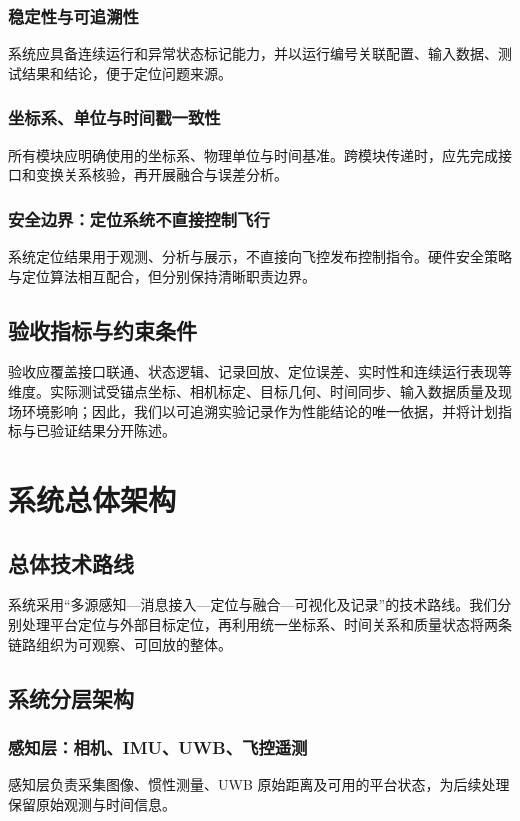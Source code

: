 \documentclass[UTF8,a4paper,12pt]{ctexart}
\begin{document}
\subsubsection{稳定性与可追溯性}
系统应具备连续运行和异常状态标记能力，并以运行编号关联配置、输入数据、测试结果和结论，便于定位问题来源。

\subsubsection{坐标系、单位与时间戳一致性}
所有模块应明确使用的坐标系、物理单位与时间基准。跨模块传递时，应先完成接口和变换关系核验，再开展融合与误差分析。

\subsubsection{安全边界：定位系统不直接控制飞行}
系统定位结果用于观测、分析与展示，不直接向飞控发布控制指令。硬件安全策略与定位算法相互配合，但分别保持清晰职责边界。

\subsection{验收指标与约束条件}
验收应覆盖接口联通、状态逻辑、记录回放、定位误差、实时性和连续运行表现等维度。实际测试受锚点坐标、相机标定、目标几何、时间同步、输入数据质量及现场环境影响；因此，我们以可追溯实验记录作为性能结论的唯一依据，并将计划指标与已验证结果分开陈述。

\section{系统总体架构}\label{sec:architecture}
\subsection{总体技术路线}
系统采用“多源感知—消息接入—定位与融合—可视化及记录”的技术路线。我们分别处理平台定位与外部目标定位，再利用统一坐标系、时间关系和质量状态将两条链路组织为可观察、可回放的整体。

\subsection{系统分层架构}
\subsubsection{感知层：相机、IMU、UWB、飞控遥测}
感知层负责采集图像、惯性测量、UWB 原始距离及可用的平台状态，为后续处理保留原始观测与时间信息。
\end{document}
